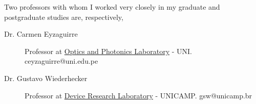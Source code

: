 \documentclass[letterpaper, 11pt]{article}[leftmargin=*]
\begin{document}
Two professors with whom I worked very closely in my graduate and postgraduate studies are, respectively,
\begin{description}
	\item[Dr. Carmen Eyzaguirre] Professor at \href{https://fc.uni.edu.pe/fc/index.php/noticias-secundarias/item/12-eyzaguirre-gorvenia-carmen}{Optics and Photonics Laboratory} - UNI. \href{ceyzaguirre@uni.edu.pe}{\faEnvelopeO} ceyzaguirre@uni.edu.pe
	\vspace{-0.05cm}
	\item[Dr. Gustavo Wiederhecker] Professor at \href{https://sites.ifi.unicamp.br/lpd/}{Device Research Laboratory} - UNICAMP. \href{gsw@unicamp.br}{\faEnvelopeO} gsw@unicamp.br
\end{description}
\end{document}
